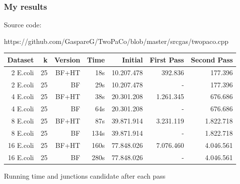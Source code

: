 \documentclass[11pt,svgnames,smaller]{beamer}
\begin{document}
 	
 	
 		\begin{frame}
		\frametitle{My results}
		\centering
		
    Source code:
    
    {\color{blue}https://github.com/GaspareG/TwoPaCo/blob/master/srcgas/twopaco.cpp}
		
		\bigskip
		
			\begin{tabular}{ | r | r | r | r | r | r | r | }
      \hline
        Dataset &  k & Version & Time &    Initial & First Pass & Second Pass \\ \hline
        
       2 E.coli & 25 & BF+HT   &  {\color{green}18s}  & 10.207.478 &    392.836 &     177.396 \\ 
       2 E.coli & 25 & BF      &    {\color{red}29s}  & 10.207.478 &          - &     177.396 \\ \hline
       
       4 E.coli & 25 & BF+HT   &  {\color{green}38s}  & 20.301.208 &  1.261.345 &     676.686 \\ 
       4 E.coli & 25 & BF      &    {\color{red}64s}  & 20.301.208 &          - &     676.686 \\ \hline
       
       8 E.coli & 25 & BF+HT   &  {\color{green}87s}  & 39.871.914 &  3.231.119 &   1.822.718 \\ 
       8 E.coli & 25 & BF      &   {\color{red}134s}  & 39.871.914 &          - &   1.822.718 \\ \hline
       
      16 E.coli & 25 & BF+HT   & {\color{green}160s}  & 77.848.026 &  7.076.460 &   4.046.561 \\ 
      16 E.coli & 25 & BF      &   {\color{red}280s}  & 77.848.026 &          - &   4.046.561 \\ 
      \hline
      \end{tabular}

      \medskip
      
  		Running time and junctions candidate after each pass
  		
 	\end{frame}
  
\end{document}
